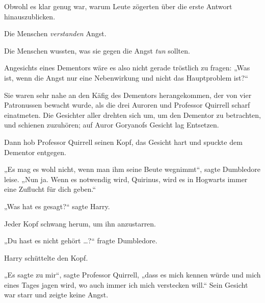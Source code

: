 Obwohl es klar genug war, warum Leute zögerten über die erste Antwort hinauszublicken.

Die Menschen \emph{verstanden} Angst.

Die Menschen wussten, was sie gegen die Angst \emph{tun} sollten.

Angesichts eines Dementors wäre es also nicht gerade tröstlich zu fragen:
„Was ist, wenn die Angst nur eine Nebenwirkung und nicht das Hauptproblem ist?“

Sie waren sehr nahe an den Käfig des Dementors herangekommen, der von vier Patronussen bewacht wurde, als die drei Auroren und Professor Quirrell scharf einatmeten. Die Gesichter aller drehten sich um, um den Dementor zu betrachten, und schienen zuzuhören; auf Auror Goryanofs Gesicht lag Entsetzen.

Dann hob Professor Quirrell seinen Kopf, das Gesicht hart und spuckte dem Dementor entgegen.

„Es mag es wohl nicht, wenn man ihm seine Beute wegnimmt“, sagte Dumbledore leise.
„Nun ja. Wenn es notwendig wird, Quirinus, wird es in Hogwarts immer eine Zuflucht für dich geben.“

„Was hat es gesagt?“ sagte Harry.

Jeder Kopf schwang herum, um ihn anzustarren.

„Du hast es nicht gehört …?“ fragte Dumbledore.

Harry schüttelte den Kopf.

„Es sagte zu mir“, sagte Professor Quirrell, „dass es mich kennen würde und mich eines Tages jagen wird, wo auch immer ich mich verstecken will.“ Sein Gesicht war starr und zeigte keine Angst.

